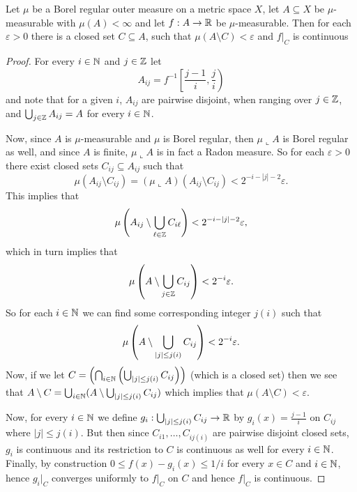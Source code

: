 \begin{theorem}\label{thm: lusin}
Let $\mu$ be a Borel regular outer measure on a metric space $X$, let $A \subseteq X$ be $\mu$-measurable with $\mu(A) < \infty$ and let $f:A \to \mathbb{R}$ be $\mu$-measurable. Then for each $\varepsilon > 0$ there is a closed set $C \subseteq A$, such that $\mu(A \setminus C) < \varepsilon$ and $f|_C$ is continuous
\end{theorem}
\begin{proof}
For every $i \in \mathbb{N}$ and $j \in \mathbb{Z}$ let
\[
    A_{ij} = f^{-1}\left[ \frac{j-1}{i}, \frac{j}{i} \right)
\]
and note that for a given $i$, $A_{ij}$ are pairwise disjoint, when ranging over $j \in \mathbb{Z}$, and $\bigcup_{j \in \mathbb{Z}} A_{ij} = A$ for every $i \in \mathbb{N}$.

Now, since $A$ is $\mu$-measurable and $\mu$ is Borel regular, then $\mu\llcorner A$ is Borel regular as well, and since $A$ is finite, $\mu \llcorner A$ is in fact a Radon measure. So for each $\varepsilon > 0$ there exist closed sets $C_{ij} \subseteq A_{ij}$ such that
\[
    \mu(A_{ij} \setminus C_{ij}) = (\mu \llcorner A)(A_{ij} \setminus C_{ij}) < 2^{-i-|j|-2}\varepsilon.
\]
This implies that
\[
    \mu\left(A_{ij} \setminus \bigcup_{\ell \in \mathbb{Z}} C_{i\ell}\right) < 2^{-i-|j|-2}\varepsilon,
\]
which in turn implies that
\[
    \mu\left(A \setminus \bigcup_{j \in \mathbb{Z}} C_{ij}\right) < 2^{-i}\varepsilon.
\]
So for each $i \in \mathbb{N}$ we can find some corresponding integer $j(i)$ such that
\[
    \mu\left(A \setminus \bigcup_{|j| \le j(i)} C_{ij} \right) < 2^{-i}\varepsilon.
\]
Now, if we let $C = \left( \bigcap_{i \in \mathbb{N}} \left( \bigcup_{|j| \le j(i)} C_{ij} \right) \right)$ (which is a closed set) then  we see that $A \setminus C = \bigcup_{i \in \mathbb{N}} (A \setminus \bigcup_{|j| \le j(i)} C_{ij})$ which implies that $\mu(A \setminus C) < \varepsilon$.

Now, for every $i \in \mathbb{N}$ we define $g_i:\bigcup_{|j| \le j(i)}C_{ij} \to \mathbb{R}$ by $g_i(x) = \frac{j-1}{i}$ on $C_{ij}$ where $|j| \le j(i)$. But then since $C_{i1}, \dots, C_{ij(i)}$ are pairwise disjoint closed sets, $g_i$ is continuous and its restriction to $C$ is continuous as well for every $i \in \mathbb{N}$. Finally, by construction $0 \le f(x) - g_i(x) \le 1/i$ for every $x \in C$ and $i \in \mathbb{N}$, hence $g_i|_C$ converges uniformly to $f|_C$ on $C$ and hence $f|_C$ is continuous.
\end{proof}

